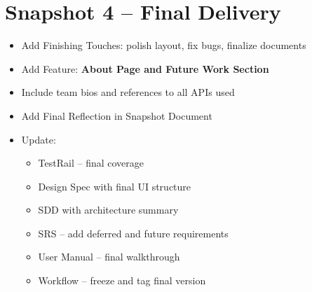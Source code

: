 \documentclass[12pt]{article}
\begin{document}
\section{Snapshot 4 – Final Delivery}
\begin{itemize}[leftmargin=*]
    \item Add Finishing Touches: polish layout, fix bugs, finalize documents
    \item Add Feature: \textbf{About Page and Future Work Section}
    \item Include team bios and references to all APIs used
    \item Add Final Reflection in Snapshot Document
    \item Update:
    \begin{itemize}
        \item TestRail – final coverage
        \item Design Spec with final UI structure
        \item SDD with architecture summary
        \item SRS – add deferred and future requirements
        \item User Manual – final walkthrough
        \item Workflow – freeze and tag final version
    \end{itemize}
\end{itemize}
\end{document}
